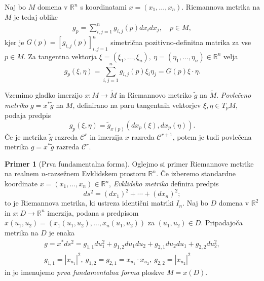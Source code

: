 \documentclass[12pt,a4paper,twoside]{article}
\theoremstyle{definition} %
\newtheorem{primer}[definicija]{Primer}
\theoremstyle{plain} %
\numberwithin{equation}{section}  %
\newcommand{\R}{\mathbb R}
\begin{document}
Naj bo $M$ domena v $\R^{n}$ s koordinatami $x = (x_{1}, \dots, x_{n})$. Riemannova metrika na $M$ je tedaj oblike
\begin{align}
g_{p} = \sum_{i,j=1}^{n} g_{i,j}(p) dx_{i} dx_{j}, \quad p \in M,
\end{align}
kjer je $G(p) = [g_{i,j}(p)]_{i,j=1}^{n}$ simetrična pozitivno-definitna matrika za vse $p \in M$. Za tangentna vektorja $\xi = (\xi_{1}, \dots, \xi_{n}), \ \eta = (\eta_{1}, \dots, \eta_{n}) \in \R^{n}$ velja
\begin{equation}
g_{p}(\xi, \eta) = \sum_{i,j=1}^{n} g_{i,j}(p) \xi_{i} \eta_{j} = G(p) \xi \cdot \eta.
\end{equation}

Vzemimo gladko imerzijo $x \colon M \to \widetilde{M}$ in Riemannovo metriko $\tilde{g}$ na $\widetilde{M}$. \emph{Povlečeno metriko} $g = x^{*} \tilde{g}$ na $M$, definirano na paru tangentnih vektorjev $\xi, \eta \in T_{p}M$, podaja predpis
\begin{equation} \label{eq:pullback-metrika}
g_{p}(\xi, \eta) = \tilde{g}_{x(p)} (dx_{p}(\xi), dx_{p}(\eta)).
\end{equation}
Če je metrika $\tilde{g}$ razreda $\mathcal{C}^{r}$ in imerzija $x$ razreda $\mathcal{C}^{r+1}$, potem je tudi povlečena metrika $g = x^{*} \tilde{g}$ razreda $\mathcal{C}^{r}$.

\begin{primer} [Prva fundamentalna forma]
Oglejmo si primer Riemannove metrike na realnem $n$-razsežnem Evklidskem prostoru $\mathbb{R}^{n}$.
Če izberemo standardne koordinate $x = (x_{1}, \dots, x_{n}) \in \mathbb{R}^{n}$, \emph{Evklidsko metriko} definira predpis
\begin{equation}
ds^2 = (dx_{1})^2 + \cdots + (dx_{n})^2;
\end{equation}
to je Riemannova metrika, ki ustreza identični matriki $I_{n}$. Naj bo $D$ domena v $\R^2$ in $x \colon D \to \R^{n}$ imerzija, podana s predpisom $x(u_1,u_2) = (x_{1}(u_1,u_2), \dots, x_{n}(u_1,u_2))$ za $(u_1,u_2) \in D$. Pripadajoča metrika na $D$ je enaka
\begin{gather*}
g = x^{*}ds^2 = g_{1,1}du_{1}^2 + g_{1,2}du_{1}du_{2} + g_{2,1}du_{2}du_{1} + g_{2,2}du_{2}^2, \\
g_{1,1} = |x_{u_1}|^2, \ g_{1,2} = g_{2,1} = x_{u_1} \cdot x_{u_2}, \ g_{2,2} = |x_{u_2}|^2
\end{gather*}
in jo imenujemo \emph{prva fundamentalna forma} ploskve $M = x(D)$.
\end{primer}
\end{document}
